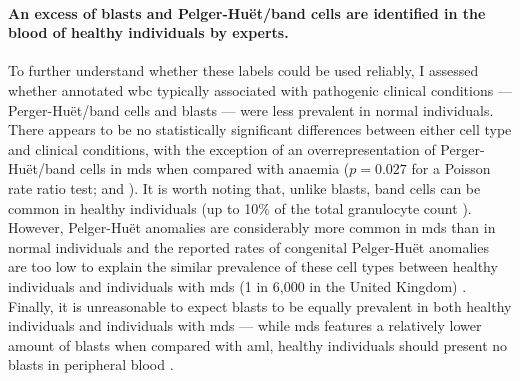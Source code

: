 \begin{figure}[!ht]
    \label{fig:mile-vice-annotated-cells-wbc-concordance}
\end{figure}

\begin{figure}[!ht]
    \label{fig:mile-vice-annotated-cells-wbc-concordance-heatmap}
\end{figure}

\paragraph{An excess of blasts and Pelger-Huët/band cells are identified in the blood of healthy individuals by experts.} To further understand whether these labels could be used reliably, I assessed whether annotated \ac{wbc} typically associated with pathogenic clinical conditions --- Perger-Huët/band cells and blasts --- were less prevalent in normal individuals. There appears to be no statistically significant differences between either cell type and clinical conditions, with the exception of an overrepresentation of Perger-Huët/band cells in \ac{mds} when compared with anaemia ($p = 0.027$ for a Poisson rate ratio test;  and ). It is worth noting that, unlike blasts, band cells can be common in healthy individuals (up to 10\% of the total granulocyte count \cite{Drees2012-sz}). However, Pelger-Huët anomalies are considerably more common in \ac{mds} than in normal individuals \cite{Kuriyama1986-ts,Colella2012-so} and the reported rates of congenital Pelger-Huët anomalies are too low to explain the similar prevalence of these cell types between healthy individuals and individuals with \ac{mds} (1 in 6,000 in the United Kingdom) \cite{Colella2012-so}. Finally, it is unreasonable to expect blasts to be equally prevalent in both healthy individuals and individuals with \ac{mds} --- while \ac{mds} features a relatively lower amount of blasts when compared with \ac{aml}, healthy individuals should present no blasts in peripheral blood \cite{Aster2020-cu}.

\begin{figure}[!ht]
    \label{fig:annotated-wbc-rate}
\end{figure}

